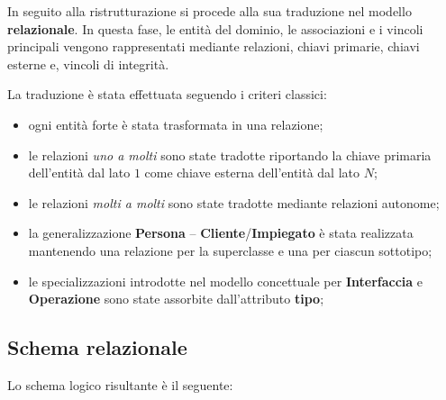 In seguito alla ristrutturazione si procede alla sua traduzione nel modello \textbf{relazionale}. In questa fase, le entità del dominio, le associazioni e i vincoli principali vengono rappresentati mediante relazioni, chiavi primarie, chiavi esterne e, vincoli di integrità.

La traduzione è stata effettuata seguendo i criteri classici:
\begin{itemize}
  \item ogni entità forte è stata trasformata in una relazione;
  \item le relazioni \textit{uno a molti} sono state tradotte riportando la chiave primaria dell'entità dal lato \(1\) come chiave esterna dell'entità dal lato \(N\);
  \item le relazioni \textit{molti a molti} sono state tradotte mediante relazioni autonome;
  \item la generalizzazione \textbf{Persona} -- \textbf{Cliente}/\textbf{Impiegato} è stata realizzata mantenendo una relazione per la superclasse e una per ciascun sottotipo;
  \item le specializzazioni introdotte nel modello concettuale per \textbf{Interfaccia} e \textbf{Operazione} sono state assorbite dall'attributo \textbf{tipo};
\end{itemize}


\subsection{Schema relazionale}

Lo schema logico risultante è il seguente:

